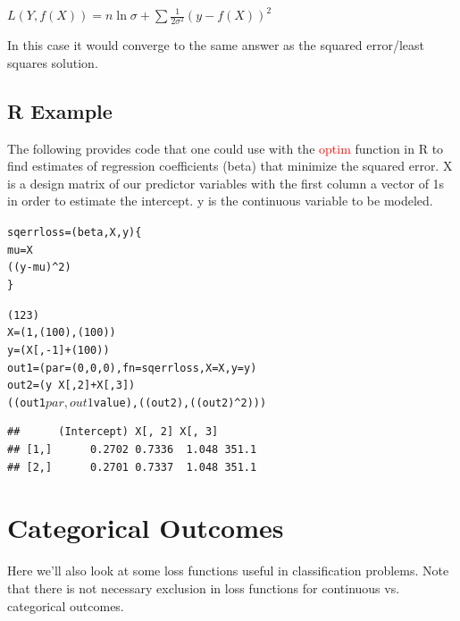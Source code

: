 \documentclass[english,nohyper,titlepage]{tufte-handout}
\begin{document}
\vspace{.25cm}
\noindent$L(Y, f(X)) = n\ln{\sigma} + \sum \frac{1}{2\sigma^2}(y-f(X))^2$
\vspace{.25cm}

In this case it would converge to the same answer as the squared error/least squares solution.


\subsection{R Example}
The following provides code that one could use with the \textcolor{red}{optim} function in R to find estimates of regression coefficients (beta) that minimize the squared error.  X is a design matrix of our predictor variables with the first column a vector of 1s in order to estimate the intercept.  y is the continuous variable to be modeled.

\begin{knitrout}\footnotesize
{}\color{fgcolor}\begin{kframe}
\begin{alltt}
sqerrloss = (beta, X, y) \{
    mu = X %
    ((y - mu)^2)
\}

(123)
X = (1, (100), (100))
y = (X[, -1] + (100))
out1 = (par = (0, 0, 0), fn = sqerrloss, X = X, y = y)
out2 = (y ~ X[, 2] + X[, 3])  
((out1$par, out1$value), ((out2), ((out2)^2)))
\end{alltt}
\begin{verbatim}
##      (Intercept) X[, 2] X[, 3]      
## [1,]      0.2702 0.7336  1.048 351.1
## [2,]      0.2701 0.7337  1.048 351.1
\end{verbatim}
\end{kframe}
\end{knitrout}


\section{Categorical Outcomes}
Here we'll also look at some loss functions useful in classification problems. Note that there is not necessary exclusion in loss functions for continuous vs. categorical outcomes.
\end{document}
